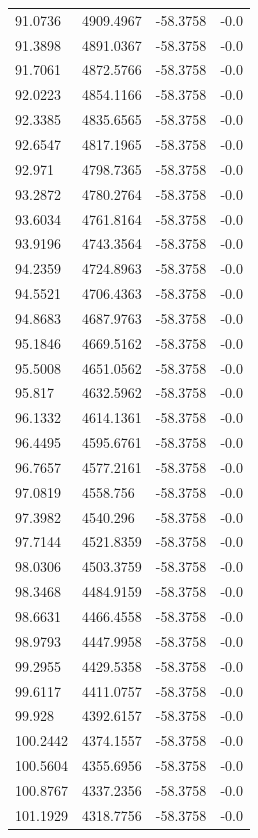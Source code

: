 \begin{table}[H]
\begin{tabular}{llll}
91.0736 & 4909.4967 & -58.3758 & -0.0 \\
91.3898 & 4891.0367 & -58.3758 & -0.0 \\
91.7061 & 4872.5766 & -58.3758 & -0.0 \\
92.0223 & 4854.1166 & -58.3758 & -0.0 \\
92.3385 & 4835.6565 & -58.3758 & -0.0 \\
92.6547 & 4817.1965 & -58.3758 & -0.0 \\
92.971 & 4798.7365 & -58.3758 & -0.0 \\
93.2872 & 4780.2764 & -58.3758 & -0.0 \\
93.6034 & 4761.8164 & -58.3758 & -0.0 \\
93.9196 & 4743.3564 & -58.3758 & -0.0 \\
94.2359 & 4724.8963 & -58.3758 & -0.0 \\
94.5521 & 4706.4363 & -58.3758 & -0.0 \\
94.8683 & 4687.9763 & -58.3758 & -0.0 \\
95.1846 & 4669.5162 & -58.3758 & -0.0 \\
95.5008 & 4651.0562 & -58.3758 & -0.0 \\
95.817 & 4632.5962 & -58.3758 & -0.0 \\
96.1332 & 4614.1361 & -58.3758 & -0.0 \\
96.4495 & 4595.6761 & -58.3758 & -0.0 \\
96.7657 & 4577.2161 & -58.3758 & -0.0 \\
97.0819 & 4558.756 & -58.3758 & -0.0 \\
97.3982 & 4540.296 & -58.3758 & -0.0 \\
97.7144 & 4521.8359 & -58.3758 & -0.0 \\
98.0306 & 4503.3759 & -58.3758 & -0.0 \\
98.3468 & 4484.9159 & -58.3758 & -0.0 \\
98.6631 & 4466.4558 & -58.3758 & -0.0 \\
98.9793 & 4447.9958 & -58.3758 & -0.0 \\
99.2955 & 4429.5358 & -58.3758 & -0.0 \\
99.6117 & 4411.0757 & -58.3758 & -0.0 \\
99.928 & 4392.6157 & -58.3758 & -0.0 \\
100.2442 & 4374.1557 & -58.3758 & -0.0 \\
100.5604 & 4355.6956 & -58.3758 & -0.0 \\
100.8767 & 4337.2356 & -58.3758 & -0.0 \\
101.1929 & 4318.7756 & -58.3758 & -0.0 \\

\end{tabular}
\end{table}
